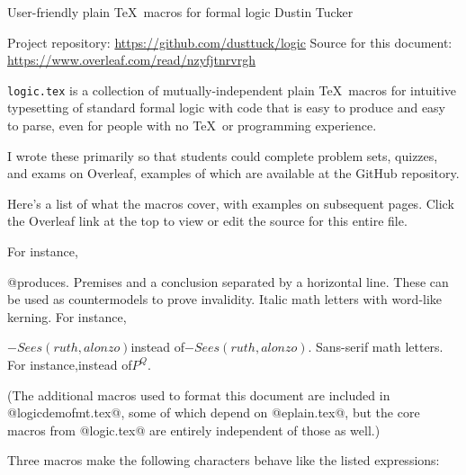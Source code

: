 



\heading
User-friendly plain \TeX\ macros for formal logic
Dustin Tucker
\resetat{}
\strut
Project repository: \url{https://github.com/dusttuck/logic}
Source for this document: \url{https://www.overleaf.com/read/nzyfjtnrvrgh}
\endheading



{\tt logic.tex} is a collection of mutually-independent plain \TeX\ macros for intuitive typesetting of standard formal logic with code that is easy to produce and easy to parse, even for people with no \TeX\ or programming experience.

I wrote these primarily so that students could complete problem sets, quizzes, and exams on Overleaf, examples of which are available at the GitHub repository.

Here's a list of what the macros cover, with examples on subsequent pages. Click the Overleaf link at the top to view or edit the source for this entire file.

\unorderedlist
{} For instance,\logicstrut{0pt}{9.5pt}
\linebreak\strut\hfil@Ax[F(x) > -G(x,a)]@\qquad produces.
 Premises and a conclusion separated by a horizontal line.
 These can be used as countermodels to prove invalidity.
\li@{} Italic math letters with word-like kerning. For instance,\logicstrut{0pt}{9.5pt}
\linebreak\strut\hfil{\itmath$-Sees(ruth,alonzo)$}\qquad instead of\qquad$-Sees(ruth,alonzo)$.
\li@{} Sans-serif math letters. For instance,\qquad instead of\qquad$P^Q$.
\endunorderedlist

(The additional macros used to format this document are included in @logicdemofmt.tex@, some of which depend on @eplain.tex@, but the core macros from @logic.tex@ are entirely independent of those as well.)


\pagebreak
\itmath



Three macros make the following characters behave like the listed expressions:

\noindent\hfil\vbox\bgroup{}\egroup\hfil

